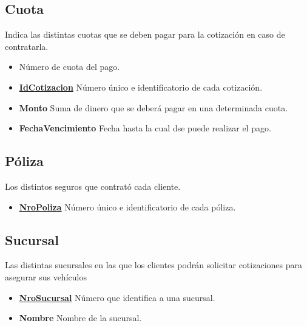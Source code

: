 \documentclass[a4paper,11pt]{article}
\begin{document}
\subsection{Cuota}

Indica las distintas cuotas que se deben pagar para la cotización en caso de contratarla.

\begin{itemize}

  \item \textbf{} Número de cuota del pago.
    
  \item \textbf{\uline{IdCotizacion}} Número único e identificatorio de cada cotización.
  
  \item \textbf{Monto} Suma de dinero que se deberá pagar en una determinada cuota.

  \item \textbf{FechaVencimiento} Fecha hasta la cual dse puede realizar el pago.

\end{itemize}

\subsection{Póliza}

Los distintos seguros que contrató cada cliente.

\begin{itemize}
   
  \item \textbf{\uline{NroPoliza}} Número único e identificatorio de cada póliza.
      
\end{itemize}

\subsection{Sucursal}

Las distintas sucursales en las que los clientes podrán solicitar cotizaciones para asegurar sus vehículos

\begin{itemize}
   
  \item \textbf{\uline{NroSucursal}} Número que identifica a una sucursal.
  
  \item \textbf{Nombre} Nombre de la sucursal.
  
\end{itemize}
\end{document}
